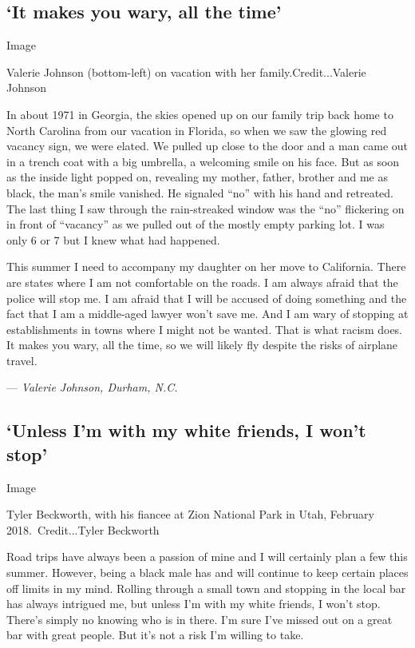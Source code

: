 \hypertarget{it-makes-you-wary-all-the-time}{%
\subsection{`It makes you wary, all the
time'}\label{it-makes-you-wary-all-the-time}}

Image

Valerie Johnson (bottom-left) on vacation with her
family.Credit...Valerie Johnson

In about 1971 in Georgia, the skies opened up on our family trip back
home to North Carolina from our vacation in Florida, so when we saw the
glowing red vacancy sign, we were elated. We pulled up close to the door
and a man came out in a trench coat with a big umbrella, a welcoming
smile on his face. But as soon as the inside light popped on, revealing
my mother, father, brother and me as black, the man's smile vanished. He
signaled ``no'' with his hand and retreated. The last thing I saw
through the rain-streaked window was the ``no'' flickering on in front
of ``vacancy'' as we pulled out of the mostly empty parking lot. I was
only 6 or 7 but I knew what had happened.

This summer I need to accompany my daughter on her move to California.
There are states where I am not comfortable on the roads. I am always
afraid that the police will stop me. I am afraid that I will be accused
of doing something and the fact that I am a middle-aged lawyer won't
save me. And I am wary of stopping at establishments in towns where I
might not be wanted. That is what racism does. It makes you wary, all
the time, so we will likely fly despite the risks of airplane travel.

--- \emph{Valerie Johnson, Durham, N.C.}

\hypertarget{unless-im-with-my-white-friends-i-wont-stop}{%
\subsection{`Unless I'm with my white friends, I won't
stop'}\label{unless-im-with-my-white-friends-i-wont-stop}}

Image

Tyler Beckworth, with his fiancee at Zion National Park in Utah,
February~ 2018.~Credit...Tyler Beckworth

Road trips have always been a passion of mine and I will certainly plan
a few this summer. However, being a black male has and will continue to
keep certain places off limits in my mind. Rolling through a small town
and stopping in the local bar has always intrigued me, but unless I'm
with my white friends, I won't stop. There's simply no knowing who is in
there. I'm sure I've missed out on a great bar with great people. But
it's not a risk I'm willing to take.

